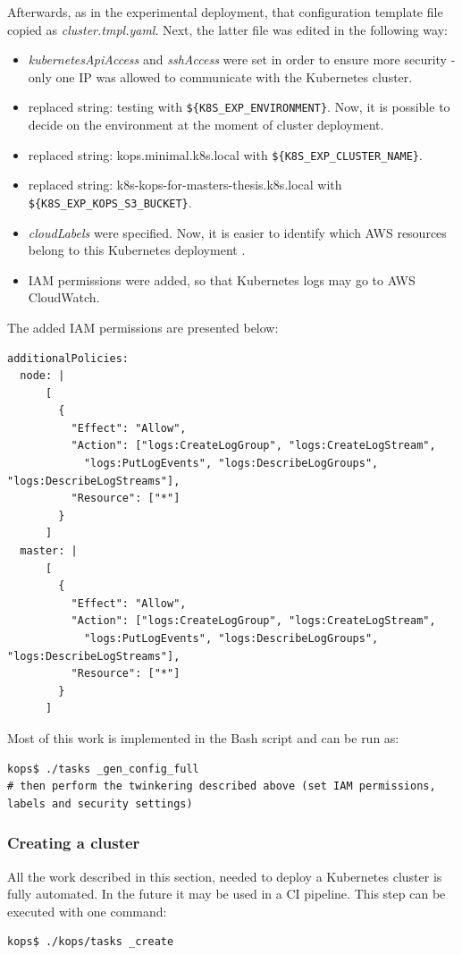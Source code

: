 Afterwards, as in the experimental deployment, that configuration template file copied as \textit{cluster.tmpl.yaml}. Next, the latter file was edited in the following way:
\begin{itemize}
\item \textit{kubernetesApiAccess} and \textit{sshAccess} were set in order to ensure more security - only one IP was allowed to communicate with the Kubernetes cluster.
\item replaced string: testing with \verb|${K8S_EXP_ENVIRONMENT}|. Now, it is possible to decide on the environment at the moment of cluster deployment.
\item replaced string: kops.minimal.k8s.local with \verb|${K8S_EXP_CLUSTER_NAME}|.
\item replaced string: k8s-kops-for-masters-thesis.k8s.local with \verb|${K8S_EXP_KOPS_S3_BUCKET}|.
\item \textit{cloudLabels} were specified. Now, it is easier to identify which AWS resources belong to this Kubernetes deployment \cite{online-kops-labels}.
\item IAM permissions were added, so that Kubernetes logs may go to AWS CloudWatch.
\end{itemize}

The added IAM permissions are presented below:
\begin{lstlisting}[basicstyle=\tiny,caption={IAM permissions added to kops cluster template needed for logging}]
additionalPolicies:
  node: |
      [
        {
          "Effect": "Allow",
          "Action": ["logs:CreateLogGroup", "logs:CreateLogStream",
            "logs:PutLogEvents", "logs:DescribeLogGroups", "logs:DescribeLogStreams"],
          "Resource": ["*"]
        }
      ]
  master: |
      [
        {
          "Effect": "Allow",
          "Action": ["logs:CreateLogGroup", "logs:CreateLogStream",
            "logs:PutLogEvents", "logs:DescribeLogGroups", "logs:DescribeLogStreams"],
          "Resource": ["*"]
        }
      ]
\end{lstlisting}

Most of this work is implemented in the Bash script and can be run as:
\begin{lstlisting}[basicstyle=\tiny,caption={Bash commands automating cluster configuration generation}]
kops$ ./tasks _gen_config_full
# then perform the twinkering described above (set IAM permissions, labels and security settings)
\end{lstlisting}

\subsubsection{Creating a cluster}
\label{kops-creating-the-cluster}
All the work described in this section, needed to deploy a Kubernetes cluster is fully automated. In the future it may be used in a CI pipeline. This step can be executed with one command:
\begin{lstlisting}[basicstyle=\tiny,caption={Bash command automating cluster creating}]
kops$ ./kops/tasks _create
\end{lstlisting}

